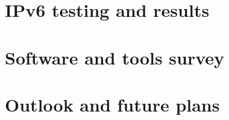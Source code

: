 \documentclass[a4paper]{jpconf}
\begin{document}
\section{IPv6 testing and results}


\section{Software and tools survey}


%

\section{Outlook and future plans}


\par

\end{document}
